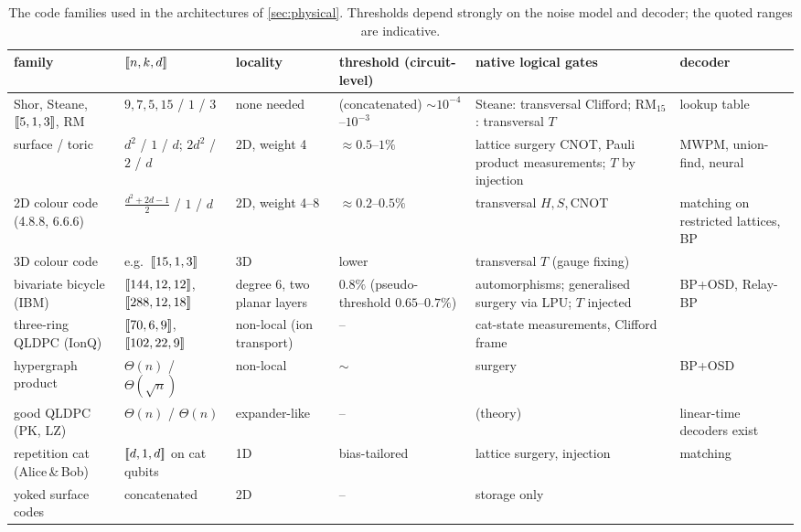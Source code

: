 \begin{table}[H]
\centering\footnotesize
\setlength{\tabcolsep}{4pt}
\begin{tabular}{@{}p{2.3cm}p{2.1cm}p{1.9cm}p{3.0cm}p{2.8cm}p{2.5cm}@{}}
\toprule
family & $[\![n,k,d]\!]$ & locality & threshold (circuit-level) & native logical gates & decoder\\
\midrule
Shor, Steane, $[\![5,1,3]\!]$, RM & $9,7,5,15$ / $1$ / $3$ & none needed & (concatenated) $\sim10^{-4}$--$10^{-3}$ & Steane: transversal Clifford; RM$_{15}$: transversal $T$ & lookup table\\
surface / toric & $d^2$ / $1$ / $d$; $2d^2$ / $2$ / $d$ & 2D, weight 4 & $\approx0.5$--$1\%$ \cite{fowler12,raussendorf07} & lattice surgery CNOT, Pauli product measurements; $T$ by injection & MWPM, union-find, neural\\
2D colour code (4.8.8, 6.6.6) & $\frac{d^2+2d-1}2$ / $1$ / $d$ & 2D, weight 4--8 & $\approx0.2$--$0.5\%$ & transversal $H,S,$CNOT & matching on restricted lattices, BP\\
3D colour code & e.g.\ $[\![15,1,3]\!]$ & 3D & lower & transversal $T$ (gauge fixing) & \\
bivariate bicycle (IBM) & $[\![144,12,12]\!]$, $[\![288,12,18]\!]$ & degree 6, two planar layers & $0.8\%$ (pseudo-threshold $0.65$--$0.7\%$) \cite{bravyi24gross} & automorphisms; generalised surgery via LPU; $T$ injected & BP+OSD, Relay-BP\\
three-ring QLDPC (IonQ) & $[\![70,6,9]\!]$, $[\![102,22,9]\!]$ & non-local (ion transport) & -- & cat-state measurements, Clifford frame & \cite{walkingcat26}\\
hypergraph product & $\Theta(n)$ / $\Theta(\sqrt n)$ & non-local & $\sim$ & surgery & BP+OSD\\
good QLDPC (PK, LZ) & $\Theta(n)$ / $\Theta(n)$ & expander-like & -- & (theory) & linear-time decoders exist\\
repetition cat (Alice\,\&\,Bob) & $[\![d,1,d]\!]$ on cat qubits & 1D & bias-tailored & lattice surgery, injection & matching\\
yoked surface codes & concatenated & 2D & -- & storage only & \\
\bottomrule
\end{tabular}
\caption{The code families used in the architectures of \cref{sec:physical}. Thresholds depend strongly on the noise model and decoder; the quoted ranges are indicative.}
\label{tab:codefamilies}
\end{table}

